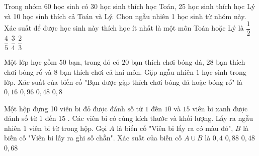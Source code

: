 \begin{ex}
	Trong nhóm 60 học sinh có 30 học sinh thích học Toán, 25 học sinh thích học Lý và 10 học sinh thích cả Toán và Lý. Chọn ngẫu nhiên 1 học sinh từ nhóm này. Xác suất để được học sinh này thích học ít nhất là một môn Toán hoặc Lý là
	\choice
	{\True $\dfrac{1}{2}$}
	{$\dfrac{4}{5}$}
	{\True $\dfrac{3}{4}$}
	{$\dfrac{2}{3}$}
\end{ex} 
\begin{ex}%
	Một lớp học gồm $50$ bạn, trong đó có $20$ bạn thích chơi bóng đá, $28$ bạn thích chơi bóng rổ và $8$ bạn thích chơi cả hai môn. Gặp ngẫu nhiên $1$ học sinh trong lớp. Xác suất của biến cố "Bạn được gặp thích chơi bóng đá hoặc bóng rổ" là
	\choice
	{$0,16$}
	{$0,96$}
	{$0,48$}
	{\True $0,8$}
\end{ex} 
\begin{ex}%
	Một hộp đựng 10 viên bi đỏ được đánh số từ $1$ đến $10$ và $15$ viên bi xanh được đánh số từ $1$ đến $15$ . Các viên bi có cùng kích thước và khối lượng. Lấy ra ngẫu nhiên $1$ viên bi từ trong hộp. Gọi $A$ là biến cố "Viên bi lấy ra có màu đỏ", $B$ là biến cố "Viên bi lấy ra ghi số chẵn". Xác suất của biến cố $A \cup B$ là
	\choice
	{$0,4$}
	{$0,88$}
	{$0,48$}
	{\True $0,68$}
\end{ex} 

